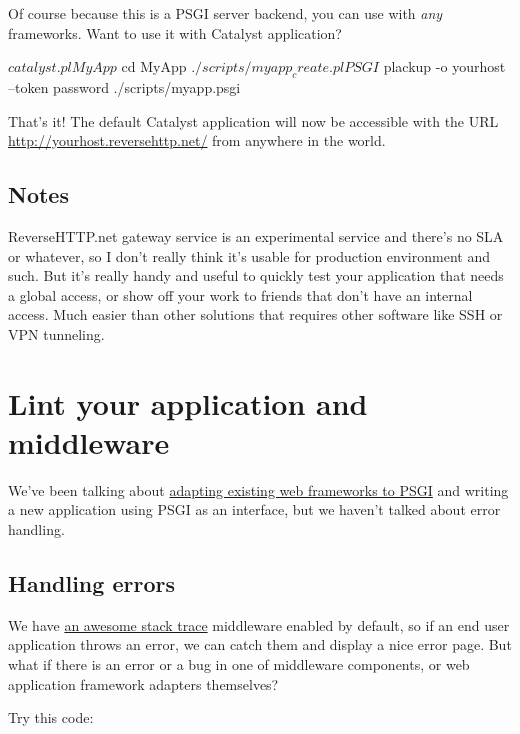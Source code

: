 Of course because this is a PSGI server backend, you can use with
\emph{any} frameworks. Want to use it with Catalyst application?

\begin{shell}
$ catalyst.pl MyApp
$ cd MyApp
$ ./scripts/myapp_create.pl PSGI
$ plackup -o yourhost --token password ./scripts/myapp.psgi
\end{shell}

That's it! The default Catalyst application will now be accessible with
the URL \url{http://yourhost.reversehttp.net/} from anywhere in the world.

\section{Notes}\label{notes}

ReverseHTTP.net gateway service is an experimental service and there's
no SLA or whatever, so I don't really think it's usable for production
environment and such. But it's really handy and useful to quickly test
your application that needs a global access, or show off your work to
friends that don't have an internal access. Much easier than other
solutions that requires other software like SSH or VPN tunneling.

\chapter{Lint your application and
middleware}\label{day-21-lint-your-application-and-middleware}

We've been talking about
\href{http://advent.plackperl.org/2009/12/day-8-adapting-web-frameworks-to-psgi.html}{adapting
existing web frameworks to PSGI} and writing a new application using
PSGI as an interface, but we haven't talked about error handling.

\section{Handling errors}\label{handling-errors}

We have
\href{http://advent.plackperl.org/2009/12/day-3-using-plackup.html}{an
awesome stack trace} middleware enabled by default, so if an end user
application throws an error, we can catch them and display a nice error
page. But what if there is an error or a bug in one of middleware
components, or web application framework adapters themselves?

Try this code:

